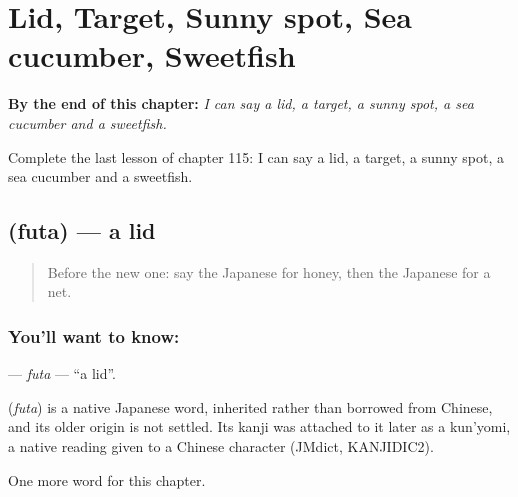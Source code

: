 
\chapter{Lid, Target, Sunny spot, Sea cucumber, Sweetfish}
\label{ch:ja-lid-target-sunny-spot-sea-cucumber-sweetfish}

\begin{chapteropening}
\textbf{By the end of this chapter:} \emph{I can say a lid, a target, a sunny spot, a sea cucumber and a sweetfish.}

Complete the last lesson of chapter 115: I can say a lid, a target, a sunny spot, a sea cucumber and a sweetfish.
\end{chapteropening}

\section[\texorpdfstring{\ja{ふた} (futa)}{ふた (futa)}]{ (futa) — a lid}

\label{lesson:JA-C115-futa}



\begin{quote}
Before the new one: say the Japanese for honey, then the Japanese for a net.
\end{quote}

\subsection*{You'll want to know: }
\textbf{} — \emph{futa} — \textquotedblleft{}a lid\textquotedblright{}.

\begin{cousinweb}
\textbf{} (\emph{futa}) is a native Japanese word, inherited rather than borrowed from Chinese, and its older origin is not settled. Its kanji was attached to it later as a kun'yomi, a native reading given to a Chinese character (JMdict, KANJIDIC2).
\end{cousinweb}

\begin{grammarlens}[title={What you've built}]
One more word for this chapter.
\end{grammarlens}

